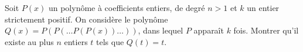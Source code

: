 Soit $P(x)$ un polynôme à coefficients entiers, de degré $n > 1$ et $k$ un entier strictement positif. On
considère le polynôme $Q(x) = P(P(\ldots P(P(x))\ldots))$, dans lequel $P$ apparaît $k$ fois. Montrer qu'il
existe au plus $n$ entiers $t$ tels que $Q(t) = t$.
